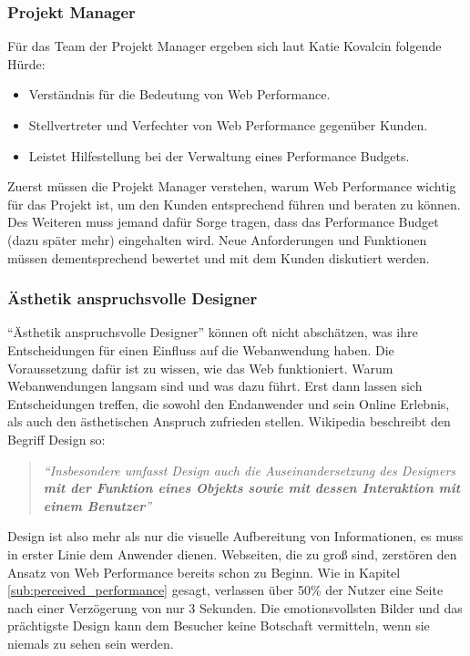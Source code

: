 		\subsubsection{Projekt Manager} %
		\label{ssub:projekt_manager}
			Für das Team der Projekt Manager ergeben sich laut Katie Kovalcin folgende Hürde: \autocite[p. 43]{kovalcin15}\\
			\begin{itemize}
				\item Verständnis für die Bedeutung von Web Performance.
				\item Stellvertreter und Verfechter von Web Performance gegenüber Kunden.
				\item Leistet Hilfestellung bei der Verwaltung eines Performance Budgets.
			\end{itemize}
			Zuerst müssen die Projekt Manager verstehen, warum Web Performance wichtig für das Projekt ist, um den Kunden entsprechend führen und beraten zu können. Des Weiteren muss jemand dafür Sorge tragen, dass das Performance Budget (dazu später mehr) eingehalten wird. Neue Anforderungen und Funktionen müssen dementsprechend bewertet und mit dem Kunden diskutiert werden.\\

		\subsubsection{Ästhetik anspruchsvolle Designer} %
		\label{ssub:aesthetic_heavy_designers}
			"`Ästhetik anspruchsvolle Designer"' können oft nicht abschätzen, was ihre Entscheidungen für einen Einfluss auf die Webanwendung haben. Die Voraussetzung dafür ist zu wissen, wie das Web funktioniert. Warum Webanwendungen langsam sind und was dazu führt. Erst dann lassen sich Entscheidungen treffen, die sowohl den Endanwender und sein Online Erlebnis, als auch den ästhetischen Anspruch zufrieden stellen. Wikipedia beschreibt den Begriff Design so:

			\begin{quote}
				\textit{"`Insbesondere umfasst Design auch die Auseinandersetzung des Designers \textbf{mit der Funktion eines Objekts sowie mit dessen Interaktion mit einem Benutzer}"'} \autocite{wikipediaDesign}
			\end{quote}

			Design ist also mehr als nur die visuelle Aufbereitung von Informationen, es muss in erster Linie dem Anwender dienen. Webseiten, die zu groß sind, zerstören den Ansatz von Web Performance bereits schon zu Beginn. Wie in Kapitel \ref{sub:perceived_performance} gesagt, verlassen über 50\% der Nutzer eine Seite nach einer Verzögerung von nur 3 Sekunden. Die emotionsvollsten Bilder und das prächtigste Design kann dem Besucher keine Botschaft vermitteln, wenn sie niemals zu sehen sein werden.

